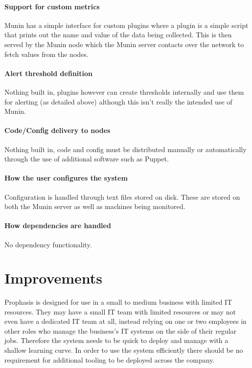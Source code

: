 \documentclass[bsc,logo,twoside]{infthesis}
\begin{document}
\paragraph*{Support for custom metrics}
Munin has a simple interface for custom plugins where a plugin is a simple
script that prints out the name and value of the data being collected.  This is
then served by the Munin node which the Munin server contacts over the network
to fetch values from the nodes.

\paragraph*{Alert threshold definition}
Nothing built in, plugins however can create thresholds internally and use them
for alerting (as detailed above) although this isn't really the intended use of
Munin.

\paragraph*{Code/Config delivery to nodes}
Nothing built in, code and config must be distributed manually or automatically
through the use of additional software such as Puppet.

\paragraph*{How the user configures the system}
Configuration is handled through text files stored on disk.  These are stored on
both the Munin server as well as machines being monitored.

\paragraph*{How dependencies are handled}
No dependency functionality.

\section{Improvements}
\paragraph*{}
	Prophasis is designed for use in a small to medium business with limited IT
	resources.  They may have a small IT team with limited resources or may not
	even have a dedicated IT team at all, instead relying on one or two employees
	in other roles who manage the business's IT systems on the side of their
	regular jobs. Therefore the system needs to be quick to deploy and manage with
	a shallow learning curve. In order to use the system efficiently there should
	be no requirement for additional tooling to be deployed across the company.
\end{document}
